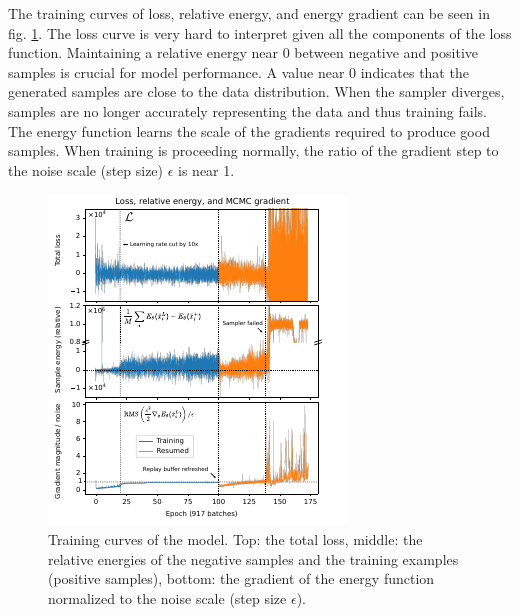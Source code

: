 The training curves of loss, relative energy, and energy gradient can be seen in fig. \ref{fig:losses-energies}. The loss curve is very hard to interpret given all the components of the loss function. Maintaining a relative energy near 0 between negative and positive samples is crucial for model performance. A value near 0 indicates that the generated samples are close to the data distribution. When the sampler diverges, samples are no longer accurately representing the data and thus training fails. The energy function learns the scale of the gradients required to produce good samples. When training is proceeding normally, the ratio of the gradient step to the noise scale (step size) $\epsilon$ is near 1. 

\begin{figure}
	\centering
	\includegraphics[width=\linewidth]{figures/losses-energies-rasterized.pdf}
	\caption{\label{fig:losses-energies}Training curves of the model. Top: the total loss, middle: the relative energies of the negative samples and the training examples (positive samples), bottom: the gradient of the energy function normalized to the noise scale (step size $\epsilon$). }
\end{figure}

